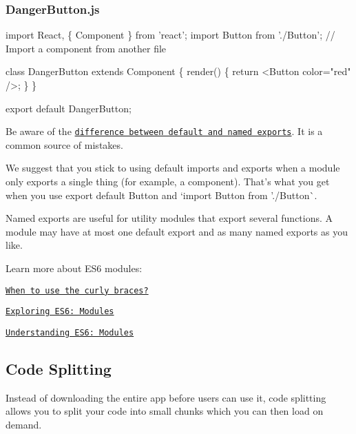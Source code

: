 \subsubsection*{{\ttfamily Danger\+Button.\+js}}


\begin{DoxyCode}
import React, \{ Component \} from 'react';
import Button from './Button'; // Import a component from another file

class DangerButton extends Component \{
  render() \{
    return <Button color="red" />;
  \}
\}

export default DangerButton;
\end{DoxyCode}


Be aware of the \href{http://stackoverflow.com/questions/36795819/react-native-es-6-when-should-i-use-curly-braces-for-import/36796281#36796281}{\tt difference between default and named exports}. It is a common source of mistakes.

We suggest that you stick to using default imports and exports when a module only exports a single thing (for example, a component). That’s what you get when you use {\ttfamily export default Button} and `import Button from './\+Button\textquotesingle{}\`{}.

Named exports are useful for utility modules that export several functions. A module may have at most one default export and as many named exports as you like.

Learn more about E\+S6 modules\+:


\begin{DoxyItemize}
\item \href{http://stackoverflow.com/questions/36795819/react-native-es-6-when-should-i-use-curly-braces-for-import/36796281#36796281}{\tt When to use the curly braces?}
\item \href{http://exploringjs.com/es6/ch_modules.html}{\tt Exploring E\+S6\+: Modules}
\item \href{https://leanpub.com/understandinges6/read#leanpub-auto-encapsulating-code-with-modules}{\tt Understanding E\+S6\+: Modules}
\end{DoxyItemize}

\subsection*{Code Splitting}

Instead of downloading the entire app before users can use it, code splitting allows you to split your code into small chunks which you can then load on demand.

